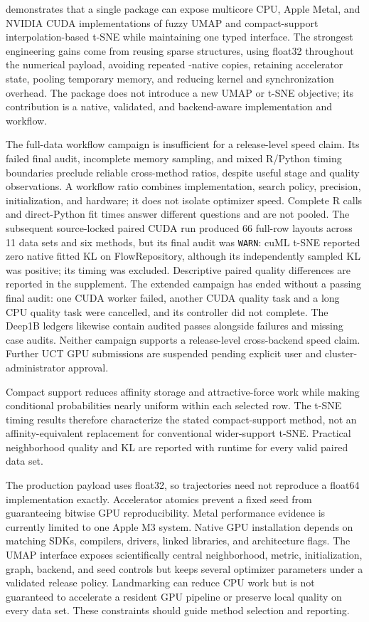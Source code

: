 \documentclass[article]{jss}
\newcommand{\fastEmbedR}{\pkg{fastEmbedR}\xspace}
\begin{document}
\fastEmbedR demonstrates that a single  package can expose
multicore CPU, Apple Metal, and NVIDIA CUDA implementations of fuzzy UMAP and
compact-support interpolation-based t-SNE while maintaining one typed
interface. The strongest
engineering gains come from reusing sparse structures, using float32
throughout the numerical payload, avoiding repeated -native
copies, retaining accelerator state, pooling temporary memory, and reducing
kernel and synchronization overhead. The package does not introduce a new
UMAP or t-SNE objective; its contribution is a native, validated, and
backend-aware implementation and workflow.

The full-data workflow campaign is insufficient for a release-level speed
claim. Its failed final audit, incomplete memory sampling, and mixed
R/Python timing boundaries preclude reliable cross-method ratios,
despite useful stage and quality observations. A workflow ratio
combines implementation, search policy, precision, initialization, and
hardware; it does not isolate optimizer speed. Complete R calls and
direct-Python fit times answer different questions and are not pooled.
The subsequent source-locked paired CUDA run produced 66 full-row layouts
across 11 data sets and six methods, but its final audit was \texttt{WARN}:
cuML t-SNE reported zero native fitted KL on FlowRepository, although
its independently sampled KL was positive; its timing was excluded.
Descriptive paired quality differences are reported
in the supplement. The extended campaign has ended without a passing
final audit: one CUDA worker failed, another CUDA quality task and a
long CPU quality task were cancelled, and its controller did not complete.
The Deep1B ledgers likewise contain audited passes alongside failures
and missing case audits. Neither campaign supports a release-level
cross-backend speed claim. Further UCT GPU submissions are suspended
pending explicit user and cluster-administrator approval.

Compact support reduces affinity storage and attractive-force work while
making conditional probabilities nearly uniform within each selected row.
The t-SNE timing results therefore characterize the stated compact-support
method, not an affinity-equivalent replacement for conventional wider-support
t-SNE. Practical neighborhood quality and KL are reported with runtime for
every valid paired data set.

The production payload uses float32, so trajectories need not reproduce a
float64 implementation exactly. Accelerator atomics prevent a fixed seed from
guaranteeing bitwise GPU reproducibility. Metal performance evidence is
currently limited to one Apple M3 system. Native GPU installation depends on
matching SDKs, compilers, drivers, linked libraries, and architecture flags.
The UMAP interface exposes scientifically central neighborhood, metric,
initialization, graph, backend, and seed controls but keeps several optimizer
parameters under a validated release policy. Landmarking can reduce CPU work
but is not guaranteed to accelerate a resident GPU pipeline or preserve local
quality on every data set. These constraints should guide method selection
and reporting.
\end{document}

